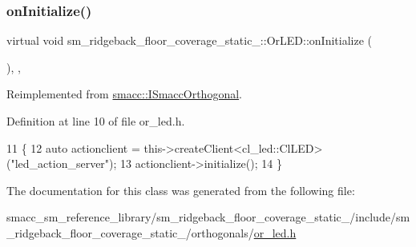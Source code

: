 \subsubsection{\texorpdfstring{on\+Initialize()}{onInitialize()}}
{\footnotesize\ttfamily virtual void sm\+\_\+ridgeback\+\_\+floor\+\_\+coverage\+\_\+static\+\_\+::\+Or\+L\+E\+D\+::on\+Initialize (\begin{DoxyParamCaption}{ }\end{DoxyParamCaption})\hspace{0.3cm}{\ttfamily [inline]}, {\ttfamily [override]}, {\ttfamily [virtual]}}



Reimplemented from \hyperlink{classsmacc_1_1ISmaccOrthogonal_a6bb31c620cb64dd7b8417f8705c79c7a}{smacc\+::\+I\+Smacc\+Orthogonal}.



Definition at line 10 of file or\+\_\+led.\+h.


\begin{DoxyCode}
11     \{
12         \textcolor{keyword}{auto} actionclient = this->createClient<cl\_led::ClLED>(\textcolor{stringliteral}{"led\_action\_server"});
13         actionclient->initialize();
14     \}
\end{DoxyCode}


The documentation for this class was generated from the following file\+:\begin{DoxyCompactItemize}
\item 
smacc\+\_\+sm\+\_\+reference\+\_\+library/sm\+\_\+ridgeback\+\_\+floor\+\_\+coverage\+\_\+static\+\_/include/sm\+\_\+ridgeback\+\_\+floor\+\_\+coverage\+\_\+static\+\_/orthogonals/\hyperlink{sm__ridgeback__floor__coverage__static__1_2include_2sm__ridgeback__floor__coverage__static__1_2orthogonals_2or__led_8h}{or\+\_\+led.\+h}\end{DoxyCompactItemize}

